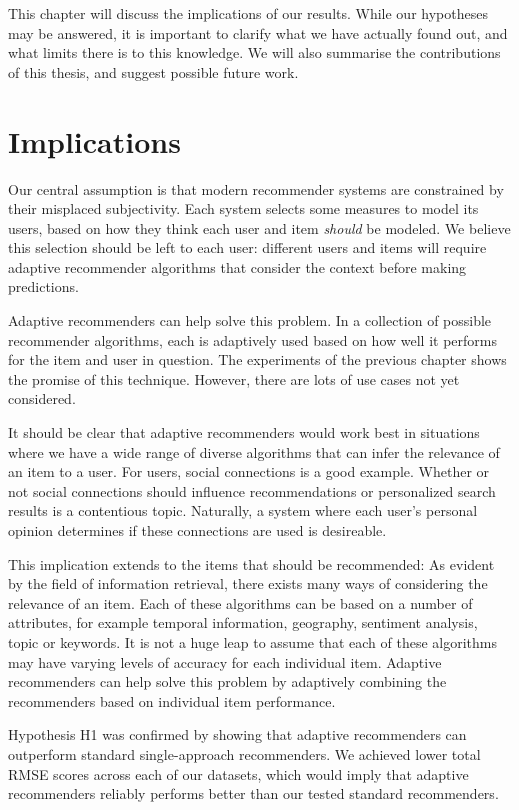 \label{chap:discussion}

This chapter will discuss the implications of our results.
While our hypotheses may be answered,
it is important to clarify what we have actually found out,
and what limits there is to this knowledge.
We will also summarise the contributions of this thesis,
and suggest possible future work.


\section{Implications}      

Our central assumption is that modern recommender systems 
are constrained by their misplaced subjectivity.
Each system selects some measures to model its users, 
based on how they think each user and item \emph{should} be modeled.
We believe this selection should be left to each user:
different users and items will require adaptive recommender algorithms that
consider the context before making predictions.

Adaptive recommenders can help solve this problem.
In a collection of possible recommender algorithms, each is adaptively used based 
on how well it performs for the item and user in question.
The experiments of the previous chapter shows the promise of this technique.
However, there are lots of use cases not yet considered.

It should be clear that adaptive recommenders would work best in situations where
we have a wide range of diverse algorithms that can infer the relevance of an item to a user.
For users, social connections is a good example. Whether or not social connections should influence
recommendations or personalized search results is a contentious topic.
Naturally, a system where each user's personal opinion determines if these connections are used is desireable.

This implication extends to the items that should be recommended:
As evident by the field of information retrieval,
there exists many ways of considering the relevance of an item. 
Each of these algorithms can be based on a number of attributes, for example
temporal information, geography, sentiment analysis, topic or keywords.
It is not a huge leap to assume that each of these algorithms may have
varying levels of accuracy for each individual item.
Adaptive recommenders can help solve this problem by adaptively 
combining the recommenders based on individual item performance.

Hypothesis H1 was confirmed by showing that adaptive recommenders
can outperform standard single-approach recommenders.
We achieved lower total RMSE scores across each of our datasets,
which would imply that adaptive recommenders
reliably performs better than our tested standard recommenders.

